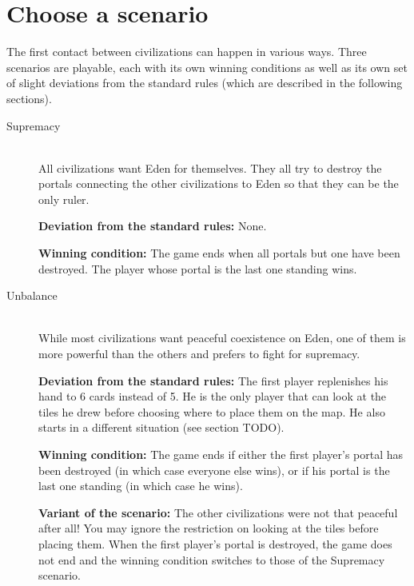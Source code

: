 \documentclass[a4paper]{article}
\begin{document}
\newpage
\section{Choose a scenario}

   The first contact between civilizations can happen in various ways.
   Three scenarios are playable, each with its own winning conditions
   as well as its own set of slight deviations from the standard rules
   (which are described in the following sections).
   
    \begin{description}
        \item[Supremacy] \hfill \\
            All civilizations want Eden for themselves.
            They all try to destroy the portals connecting the other civilizations to Eden
            so that they can be the only ruler.
            
            \textbf{Deviation from the standard rules:}
            None.
            
            \textbf{Winning condition:}
            The game ends when all portals but one have been destroyed.
            The player whose portal is the last one standing wins.


        \item[Unbalance] \hfill \\
            While most civilizations want peaceful coexistence on Eden,
            one of them is more powerful than the others
            and prefers to fight for supremacy.
            
            \textbf{Deviation from the standard rules:}
            The first player replenishes his hand to 6 cards instead of 5.
            He is the only player that can look at the tiles he drew before choosing
            where to place them on the map.
            He also starts in a different situation (see section TODO).
            
            \textbf{Winning condition:}
            The game ends if either the first player's portal has been destroyed
            (in which case everyone else wins),
            or if his portal is the last one standing (in which case he wins).
            
            \textbf{Variant of the scenario:}
            The other civilizations were not that peaceful after all!
            You may ignore the restriction on looking at the tiles before placing them.
            When the first player's portal is destroyed,
            the game does not end and the winning condition switches to those
            of the Supremacy scenario.
            



\end{description}
\end{document}
